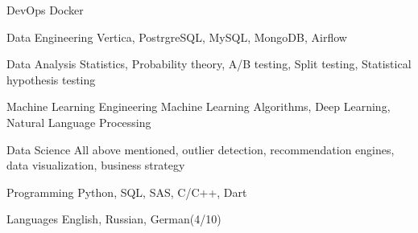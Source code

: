 

\begin{cvskills}

  \cvskill
    {DevOps} %
    {Docker} %

  \cvskill
    {Data Engineering} %
    {Vertica, PostrgreSQL, MySQL, MongoDB, Airflow} %

  \cvskill
    {Data Analysis} %
    {Statistics, Probability theory, A/B testing, Split testing, Statistical hypothesis testing} %

  \cvskill
    {Machine Learning Engineering} %
    {Machine Learning Algorithms, Deep Learning, Natural Language Processing} %

  \cvskill
    {Data Science} %
    {All above mentioned, outlier detection, recommendation engines, data visualization, business strategy} %

  \cvskill
    {Programming} %
    {Python, SQL, SAS, C/C++, Dart} %


  \cvskill
    {Languages} %
    {English, Russian, German(4/10)} %

\end{cvskills}
